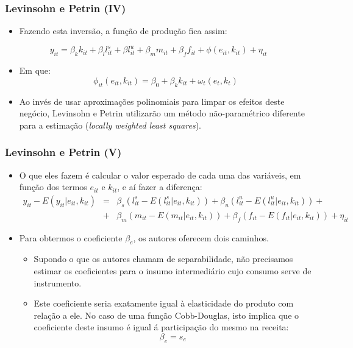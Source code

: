 \documentclass{beamer}
\begin{document}
\begin{frame}\frametitle{Levinsohn e Petrin (IV)}

\begin{itemize}
\item Fazendo esta inversão, a função de produção fica assim:
\end{itemize}
\[
y_{it}=\beta_{k}k_{it}+\beta_{l}l_{it}^{s}+\beta l_{it}^{u}+\beta_{m}m_{it}+\beta_{f}f_{it}+\phi(e_{it},k_{it})+\eta_{it}
\]

\begin{itemize}
\item Em que:
\[
\phi_{it}(e_{it},k_{it})=\beta_{0}+\beta_{k}k_{it}+\omega_{t}(e_{t},k_{t})
\]
\item Ao invés de usar aproximações polinomiais para limpar os efeitos deste
negócio, Levinsohn e Petrin utilizarão um método não-paramétrico diferente
para a estimação (\emph{locally weighted least squares}). 
\end{itemize}
\end{frame}

\begin{frame}\frametitle{Levinsohn e Petrin (V)}

\begin{itemize}
\item O que eles fazem é calcular o valor esperado de cada uma das variáveis,
em função dos termos $e_{it}$ e $k_{it}$, e aí fazer a diferença:{\scriptsize{}
\begin{eqnarray*}
y_{it}-E(y_{it}|e_{it},k_{it}) & = & \beta_{s}(l_{it}^{s}-E(l_{it}^{s}|e_{it},k_{it}))+\beta_{u}(l_{it}^{u}-E(l_{it}^{u}|e_{it},k_{it}))+\\
 & + & \beta_{m}(m_{it}-E(m_{it}|e_{it},k_{it}))+\beta_{f}(f_{it}-E(f_{it}|e_{it},k_{it}))+\eta_{it}
\end{eqnarray*}
}{\scriptsize \par}
\item Para obtermos o coeficiente $\beta_{e}$, os autores oferecem dois
caminhos.

\begin{itemize}
\item Supondo o que os autores chamam de separabilidade, não precisamos
estimar os coeficientes para o insumo intermediário cujo consumo serve
de instrumento. 
\item Este coeficiente seria exatamente igual à elasticidade do produto
com relação a ele. No caso de uma função Cobb-Douglas, isto implica
que o coeficiente deste insumo é igual á participação do mesmo na
receita:
\[
\beta_{e}=s_{e}
\]
\end{itemize}
\end{itemize}
\end{frame}
\end{document}
